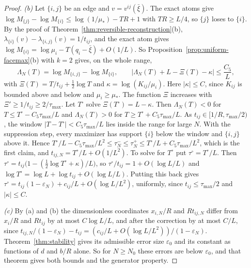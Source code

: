 \begin{proof}
\emph{(b)} Let $\{i,j\}$ be an edge and $v=v^{ij}(\bar\xi)$. The exact atoms give
$\log M_{\{j\}}-\log M_{\{i\}}\le\log(1/\mu_*)-TR+1$ with $TR\ge L/4$, so $\{j\}$ loses to
$\{i\}$. By the proof of Theorem~\ref{thm:reversible-reconstruction}(b),
$\lambda_{\{i\}}(v)-\lambda_{\{i,j\}}(v)=1/t_{ij}$, and the exact atom gives
$\log M_{\{i\}}=\log\mu_i-T(q_i-\bar\xi)+O(1/L)$. So Proposition~\ref{prop:uniform-facemax}(b)
with $k=2$ gives, on the whole range,
\[
 \Lambda_N(T)=\log M_{\{i,j\}}-\log M_{\{i\}},\qquad\bigl|\Lambda_N(T)+L-\Xi(T)-\kappa\bigr|\le\frac{C_5}L,
\]
with $\Xi(T)=T/t_{ij}+\frac12\log T$ and $\kappa=\log(K_{ij}/\mu_i)$. Here $|\kappa|\le C$, since
$K_{ij}$ is bounded above and below and $\mu_i\ge\mu_*$. The function $\Xi$ increases with
$\Xi'\ge1/t_{ij}\ge2/\tau_{\max}$. Let $T^\circ$ solve $\Xi(T^\circ)=L-\kappa$. Then $\Lambda_N(T)<0$ for
$T\le T^\circ-C_5\tau_{\max}/L$ and $\Lambda_N(T)>0$ for $T\ge T^\circ+C_5\tau_{\max}/L$. As $t_{ij}\in[1/R,\tau_{\max}/2)$, the
window $|T-T^\circ|<C_5\tau_{\max}/L$ lies inside the range for large $N$. With the suppression step, every
maximizer has support $\{i\}$ below the window and $\{i,j\}$ above it. Hence
$T^\circ/L-C_5\tau_{\max}/L^2\le\tau^-_N\le\tau^+_N\le T^\circ/L+C_5\tau_{\max}/L^2$, which is the first claim, and
$t_{ij,N}=T^\circ/L+O(1/L^2)$. To solve for $T^\circ$ put $\tau^\circ=T^\circ/L$. Then
$\tau^\circ=t_{ij}\bigl(1-(\frac12\log T^\circ+\kappa)/L\bigr)$, so
$\tau^\circ/t_{ij}=1+O(\log L/L)$ and $\log T^\circ=\log L+\log t_{ij}+O(\log L/L)$. Putting this
back gives $\tau^\circ=t_{ij}(1-\varepsilon_N)+c_{ij}/L+O(\log L/L^2)$, uniformly, since
$t_{ij}\le \tau_{\max}/2$ and $|\kappa|\le C$.

\emph{(c)} By (a) and (b) the dimensionless coordinates $x_{i,N}/R$ and $Rt_{ij,N}$ differ from
$x_i/R$ and $Rt_{ij}$ by at most $C\log L/L$, and after the correction by at most $C/L$, since
$t_{ij,N}/(1-\varepsilon_N)-t_{ij}=(c_{ij}/L+O(\log L/L^2))/(1-\varepsilon_N)$.
Theorem~\ref{thm:stability} gives its admissible error size $\varepsilon_0$ and its constant as
functions of $d$ and $b/R$ alone. So for $N\ge N_0$ these errors are below $\varepsilon_0$, and
that theorem gives both bounds and the generator property.
\end{proof}


